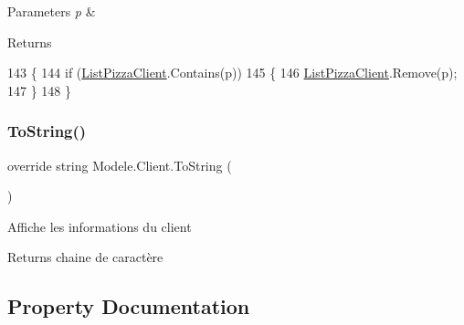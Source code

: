 \begin{DoxyParams}{Parameters}
{\em p} & \\
\hline
\end{DoxyParams}
\begin{DoxyReturn}{Returns}

\end{DoxyReturn}

\begin{DoxyCode}
143         \{
144             \textcolor{keywordflow}{if} (\hyperlink{classModele_1_1Client_a14c37e4b9ab856a1e36b7c1610a0536c}{ListPizzaClient}.Contains(p))
145             \{
146                 \hyperlink{classModele_1_1Client_a14c37e4b9ab856a1e36b7c1610a0536c}{ListPizzaClient}.Remove(p);
147             \}
148         \}
\end{DoxyCode}
\mbox{\label{classModele_1_1Client_a2b501ef9cac78e16336bef494ac6a7d8}} 
\subsubsection{\texorpdfstring{To\+String()}{ToString()}}
{\footnotesize\ttfamily override string Modele.\+Client.\+To\+String (\begin{DoxyParamCaption}{ }\end{DoxyParamCaption})\hspace{0.3cm}{\ttfamily [inline]}}



Affiche les informations du client 

\begin{DoxyReturn}{Returns}
chaine de caractère
\end{DoxyReturn}



\subsection{Property Documentation}
\mbox{\label{classModele_1_1Client_a14c37e4b9ab856a1e36b7c1610a0536c}} 
